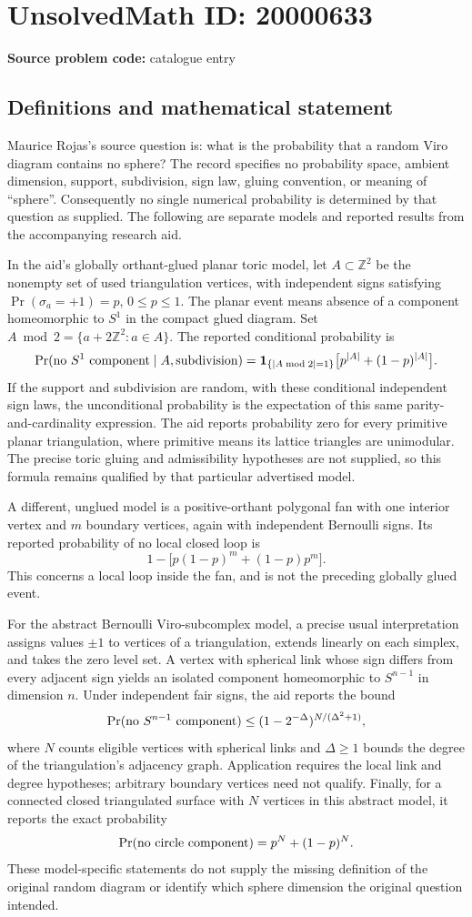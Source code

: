 \documentclass[11pt]{article}
\newcommand{\Z}{\mathbb{Z}}
\begin{document}
\section*{UnsolvedMath ID: 20000633}
\textbf{Source problem code:} catalogue entry
\subsection{Definitions and mathematical statement}
Maurice Rojas's source question is: what is the probability that a random Viro diagram contains no sphere? The record specifies no probability space, ambient dimension, support, subdivision, sign law, gluing convention, or meaning of ``sphere''. Consequently no single numerical probability is determined by that question as supplied. The following are separate models and reported results from the accompanying research aid.

In the aid's globally orthant-glued planar toric model, let $A\subset\Z^2$ be the nonempty set of used triangulation vertices, with independent signs satisfying $\Pr(\sigma_a=+1)=p$, $0\leq p\leq1$. The planar event means absence of a component homeomorphic to $S^1$ in the compact glued diagram. Set $A\bmod2=\{a+2\Z^2:a\in A\}$. The reported conditional probability is
\[
 \Pr(\hbox{no }S^1\hbox{ component}\mid A,\hbox{subdivision})
 =\mathbf1_{\{|A\bmod2|=1\}}\bigl[p^{|A|}+(1-p)^{|A|}\bigr].
\]
If the support and subdivision are random, with these conditional independent sign laws, the unconditional probability is the expectation of this same parity-and-cardinality expression. The aid reports probability zero for every primitive planar triangulation, where primitive means its lattice triangles are unimodular. The precise toric gluing and admissibility hypotheses are not supplied, so this formula remains qualified by that particular advertised model.

A different, unglued model is a positive-orthant polygonal fan with one interior vertex and $m$ boundary vertices, again with independent Bernoulli signs. Its reported probability of no local closed loop is
\[
 1-\bigl[p(1-p)^m+(1-p)p^m\bigr].
\]
This concerns a local loop inside the fan, and is not the preceding globally glued event.

For the abstract Bernoulli Viro-subcomplex model, a precise usual interpretation assigns values $\pm1$ to vertices of a triangulation, extends linearly on each simplex, and takes the zero level set. A vertex with spherical link whose sign differs from every adjacent sign yields an isolated component homeomorphic to $S^{n-1}$ in dimension $n$. Under independent fair signs, the aid reports the bound
\[
 \Pr(\hbox{no }S^{n-1}\hbox{ component})
 \leq (1-2^{-\Delta})^{N/(\Delta^2+1)},
\]
where $N$ counts eligible vertices with spherical links and $\Delta\geq1$ bounds the degree of the triangulation's adjacency graph. Application requires the local link and degree hypotheses; arbitrary boundary vertices need not qualify. Finally, for a connected closed triangulated surface with $N$ vertices in this abstract model, it reports the exact probability
\[
 \Pr(\hbox{no circle component})=p^N+(1-p)^N.
\]
These model-specific statements do not supply the missing definition of the original random diagram or identify which sphere dimension the original question intended.
\end{document}
